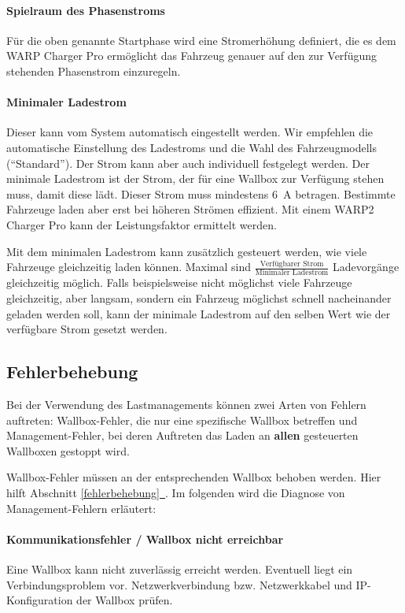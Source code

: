 \documentclass[a4paper,10pt]{article}
\newcommand*{\fullref}[1]{Abschnitt \hyperref[{#1}]{\ref*{#1}~\nameref*{#1}}}
\begin{document}
\begin{multicols*}{2}
    \paragraph{Spielraum des Phasenstroms}
    Für die oben genannte Startphase wird eine Stromerhöhung definiert, die es
    dem WARP Charger Pro ermöglicht das Fahrzeug genauer auf den zur Verfügung
    stehenden Phasenstrom einzuregeln.

    \paragraph{Minimaler Ladestrom}
    Dieser kann vom System automatisch eingestellt werden. Wir empfehlen die automatische Einstellung des Ladestroms und die Wahl des Fahrzeugmodells (\enquote{Standard}).
    Der Strom kann aber auch individuell festgelegt werden.
    Der minimale Ladestrom ist der Strom, der für eine Wallbox zur Verfügung stehen muss, damit diese lädt. Dieser Strom muss mindestens \SI{6}{\ampere} betragen.
    Bestimmte Fahrzeuge laden aber erst bei höheren Strömen effizient. Mit einem WARP2 Charger Pro kann der Leistungsfaktor ermittelt werden.

    Mit dem minimalen Ladestrom kann zusätzlich gesteuert werden, wie viele Fahrzeuge gleichzeitig laden können.
    Maximal sind $\frac{\text{Verfügbarer Strom}}{\text{Minimaler Ladestrom}}$ Ladevorgänge gleichzeitig möglich. Falls beispielsweise nicht möglichst viele
    Fahrzeuge gleichzeitig, aber langsam, sondern ein Fahrzeug möglichst schnell nacheinander geladen werden soll, kann der minimale Ladestrom auf den selben Wert
    wie der verfügbare Strom gesetzt werden.

    \subsection{Fehlerbehebung}
    Bei der Verwendung des Lastmanagements können zwei Arten von Fehlern auftreten: Wallbox-Fehler, die nur eine spezifische Wallbox betreffen und Management-Fehler,
    bei deren Auftreten das Laden an \textbf{allen} gesteuerten Wallboxen gestoppt wird.

    Wallbox-Fehler müssen an der entsprechenden Wallbox behoben werden. Hier hilft \fullref{fehlerbehebung}. Im folgenden wird die Diagnose von Management-Fehlern erläutert:

    \paragraph{Kommunikationsfehler / Wallbox nicht erreichbar}
    Eine Wallbox kann nicht zuverlässig erreicht werden. Eventuell liegt ein Verbindungsproblem vor. Netzwerkverbindung bzw. Netzwerkkabel und IP-Konfiguration der Wallbox prüfen.


\end{multicols*}
\end{document}
